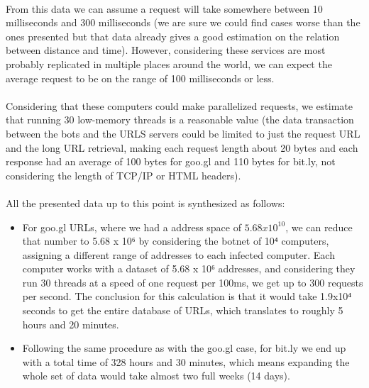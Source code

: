 \documentclass[12pt]{article}
\begin{document}
\paragraph{}
From this data we can assume a request will take somewhere between 10 milliseconds and 300 milliseconds (we are sure we could find cases worse than the ones presented but that data already gives a good estimation on the relation between distance and time). However, considering these services are most probably replicated in multiple places around the world, we can expect the average request to be on the range of 100 milliseconds or less.

\paragraph{}
Considering that these computers could make parallelized requests, we estimate that running 30 low-memory threads is a reasonable value (the data transaction between the bots and the URLS servers could be limited to just the request URL and the long URL retrieval, making each request length about 20 bytes and each response had an average of 100 bytes for goo.gl and 110 bytes for bit.ly, not considering the length of TCP/IP or HTML headers).

\paragraph{}
All the presented data up to this point is synthesized as follows:

\begin{itemize}

\item  For goo.gl URLs, where we had a address space of $5.68 x 10^{10}$, we can reduce that number to 5.68 x 10⁶ by considering the botnet of 10⁴ computers, assigning a different range of addresses to each infected computer. Each computer works with a dataset of 5.68 x 10⁶ addresses, and considering they run 30 threads at a speed of one request per 100ms, we get up to 300 requests per second. The conclusion for this calculation is that it would take 1.9x10⁴ seconds to get the entire database of URLs, which translates to roughly 5 hours and 20 minutes.

\item  Following the same procedure as with the goo.gl case, for bit.ly we end up with a total time of 328 hours and 30 minutes, which means expanding the whole set of data would take almost two full weeks (14 days).

\end{itemize}
\end{document}
